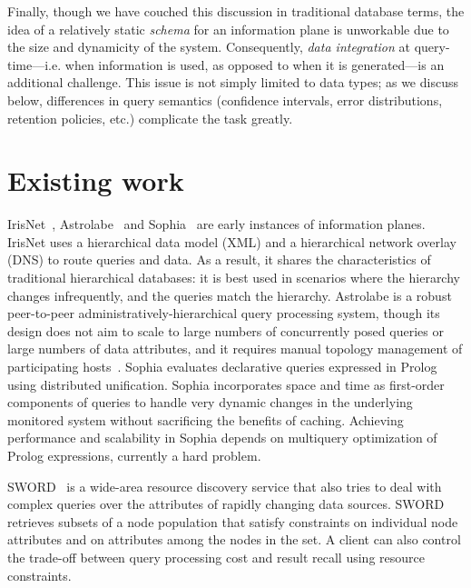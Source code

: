 \documentclass[10pt,twocolumn]{MyTightStyle}
\def\IP{information plane\xspace}
\begin{document}
Finally, though we have couched this discussion in traditional database
terms, the idea of a relatively static \emph{schema} for an \IP is
unworkable due to the size and dynamicity of the system.
Consequently, \textit{data integration} at query-time---i.e. when
information is used, as opposed to when it is generated---is an additional
challenge.  This issue is not simply limited to data types; as
we discuss below, differences in query semantics (confidence
intervals, error distributions, retention policies, etc.) complicate
the task greatly.

\section{Existing work}
\label{sec:related}

IrisNet~\cite{Gibbons2003}, Astrolabe~\cite{VanRenesse2003}
and Sophia~\cite{Wawrzoniak2003} are
early instances of information planes. IrisNet uses a hierarchical data
model (XML) and a hierarchical network
overlay (DNS) to route queries and data.  As a result, it shares
the characteristics of traditional hierarchical databases: it is best
used in scenarios where the hierarchy changes infrequently, and the
queries match the hierarchy.  Astrolabe is a robust peer-to-peer
administratively-hierarchical query processing system, though its
design does not aim to scale to large numbers of concurrently posed
queries or large numbers of data attributes, and it requires manual
topology management of participating hosts~\cite{VanRenesse2003FuDiCo}.
Sophia evaluates declarative queries expressed
in Prolog using distributed unification.  Sophia incorporates space
and time as first-order components of queries to
handle very dynamic changes in the underlying monitored system without
sacrificing the benefits of caching.  Achieving performance and
scalability in Sophia depends on multiquery optimization of Prolog
expressions, currently a hard problem.

SWORD~\cite{Oppenheimer2004} is a wide-area resource discovery service
that also tries to deal with complex queries over the attributes of
rapidly changing data sources.  SWORD retrieves subsets of a node
population that satisfy constraints on
individual node attributes and on attributes among the nodes in the set.
A client can also control the trade-off between query processing cost and
result recall using resource constraints.
\end{document}
